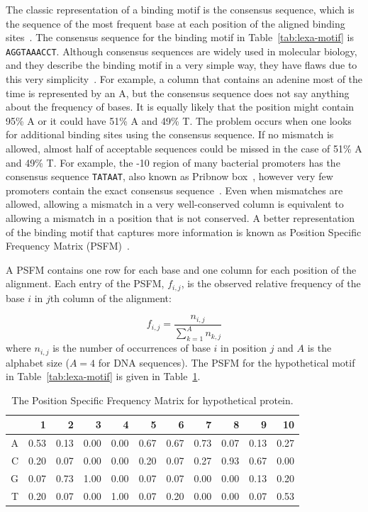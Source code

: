 The classic representation of a binding motif is the consensus sequence, which
is the
sequence of the most frequent base at each position of the aligned binding
sites~\citep{pierce2012genetics}. The consensus sequence for the binding motif
in Table~\ref{tab:lexa-motif} is \texttt{AGGTAAACCT}. Although consensus
sequences are widely used in molecular biology, and they describe the binding
motif in a very simple way, they have flaws due to this very
simplicity~\citep{schneider2002consensus}. For example, a column that contains
an adenine most of the time is represented by an A, but the consensus sequence
does not say anything about the frequency of bases. It is equally likely that
the position might contain 95\% A or it could have 51\% A and 49\% T. The
problem occurs when one looks for additional binding sites using the consensus
sequence.  If no mismatch is allowed, almost half of acceptable sequences could
be missed in the case of 51\% A and 49\% T. For example, the -10 region of many
bacterial promoters has the consensus sequence \texttt{TATAAT}, also known as
Pribnow box~\citep{pribnow1975nucleotide}, however very few promoters
contain the exact consensus sequence~\citep{lisser1993compilation}. Even when
mismatches are allowed, allowing a mismatch in a very well-conserved column
is equivalent to allowing a mismatch in a position that is not
conserved. A better representation of the binding motif that captures more
information is known as Position Specific Frequency Matrix (PSFM)~\citep{stormo2000dna}.

A PSFM contains one row for each base and one column for each position of the
alignment. Each entry of the PSFM, $f_{i, j}$, is the observed relative
frequency of the base $i$ in $j$th column of the alignment:

\begin{equation}
  \label{eq:psfm}
  f_{i, j} = \frac{n_{i, j}}{\displaystyle\sum_{k=1}^A n_{k, j}}
\end{equation}
where $n_{i, j}$ is the number of occurrences of base $i$ in position $j$ and
$A$ is the alphabet size ($A=4$ for DNA sequences). The PSFM for the
hypothetical motif in Table~\ref{tab:lexa-motif} is given in
Table~\ref{tab:psfm}.

\begin{table}
  \centering
  \caption{The Position Specific Frequency Matrix for hypothetical protein.}
\label{tab:psfm}
  \begin{tabular}{|r|r|r|r|r|r|r|r|r|r|r|}
\hline
  &    1 &   2 &    3 &    4 &    5 &    6 &    7 &    8 &    9 & 10\\
\hline
A & 0.53 & 0.13 & 0.00 & 0.00 & 0.67 & 0.67 & 0.73 & 0.07 & 0.13 & 0.27 \\
\hline
C & 0.20 & 0.07 & 0.00 & 0.00 & 0.20 & 0.07 & 0.27 & 0.93 & 0.67 & 0.00 \\
\hline
G & 0.07 & 0.73 & 1.00 & 0.00 & 0.07 & 0.07 & 0.00 & 0.00 & 0.13 & 0.20 \\
\hline
T & 0.20 & 0.07 & 0.00 & 1.00 & 0.07 & 0.20 & 0.00 & 0.00 & 0.07 & 0.53 \\
\hline
  \end{tabular}
\end{table}

